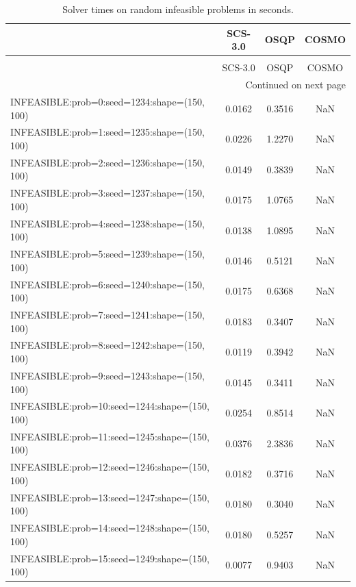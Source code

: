 \begin{longtable}{lccc}
\caption{Solver times on random infeasible problems in seconds.}
\label{t-random infeasible-results}\\
\toprule
{} &  SCS-3.0 &    OSQP &  COSMO \\
\midrule
\endfirsthead
\caption[]{Solver times on random infeasible problems in seconds.} \\
\toprule
{} &  SCS-3.0 &    OSQP &  COSMO \\
\midrule
\endhead
\midrule
\multicolumn{4}{r}{{Continued on next page}} \\
\midrule
\endfoot

\bottomrule
\endlastfoot
INFEASIBLE:prob=0:seed=1234:shape=(150, 100)   &   0.0162 &  0.3516 &    NaN \\
INFEASIBLE:prob=1:seed=1235:shape=(150, 100)   &   0.0226 &  1.2270 &    NaN \\
INFEASIBLE:prob=2:seed=1236:shape=(150, 100)   &   0.0149 &  0.3839 &    NaN \\
INFEASIBLE:prob=3:seed=1237:shape=(150, 100)   &   0.0175 &  1.0765 &    NaN \\
INFEASIBLE:prob=4:seed=1238:shape=(150, 100)   &   0.0138 &  1.0895 &    NaN \\
INFEASIBLE:prob=5:seed=1239:shape=(150, 100)   &   0.0146 &  0.5121 &    NaN \\
INFEASIBLE:prob=6:seed=1240:shape=(150, 100)   &   0.0175 &  0.6368 &    NaN \\
INFEASIBLE:prob=7:seed=1241:shape=(150, 100)   &   0.0183 &  0.3407 &    NaN \\
INFEASIBLE:prob=8:seed=1242:shape=(150, 100)   &   0.0119 &  0.3942 &    NaN \\
INFEASIBLE:prob=9:seed=1243:shape=(150, 100)   &   0.0145 &  0.3411 &    NaN \\
INFEASIBLE:prob=10:seed=1244:shape=(150, 100)  &   0.0254 &  0.8514 &    NaN \\
INFEASIBLE:prob=11:seed=1245:shape=(150, 100)  &   0.0376 &  2.3836 &    NaN \\
INFEASIBLE:prob=12:seed=1246:shape=(150, 100)  &   0.0182 &  0.3716 &    NaN \\
INFEASIBLE:prob=13:seed=1247:shape=(150, 100)  &   0.0180 &  0.3040 &    NaN \\
INFEASIBLE:prob=14:seed=1248:shape=(150, 100)  &   0.0180 &  0.5257 &    NaN \\
INFEASIBLE:prob=15:seed=1249:shape=(150, 100)  &   0.0077 &  0.9403 &    NaN \\

\end{longtable}
